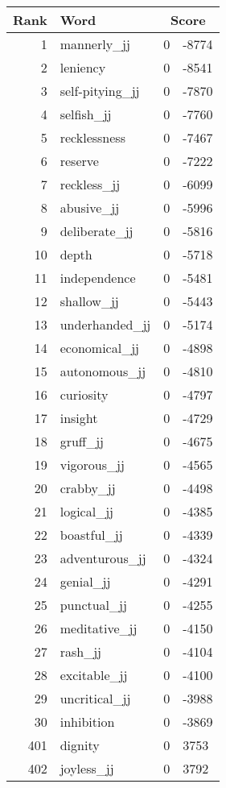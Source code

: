 \begin{longtable}[!htbp]{| rlr@{.}l |}
    \hline
    \textbf{Rank} & \textbf{Word} & \multicolumn{2}{c|}{\textbf{Score}} \\
    \hline
    \endhead
    1 & mannerly\_jj & 0 & -8774 \\
    2 & leniency & 0 & -8541 \\
    3 & self-pitying\_jj & 0 & -7870 \\
    4 & selfish\_jj & 0 & -7760 \\
    5 & recklessness & 0 & -7467 \\
    6 & reserve & 0 & -7222 \\
    7 & reckless\_jj & 0 & -6099 \\
    8 & abusive\_jj & 0 & -5996 \\
    9 & deliberate\_jj & 0 & -5816 \\
    10 & depth & 0 & -5718 \\
    11 & independence & 0 & -5481 \\
    12 & shallow\_jj & 0 & -5443 \\
    13 & underhanded\_jj & 0 & -5174 \\
    14 & economical\_jj & 0 & -4898 \\
    15 & autonomous\_jj & 0 & -4810 \\
    16 & curiosity & 0 & -4797 \\
    17 & insight & 0 & -4729 \\
    18 & gruff\_jj & 0 & -4675 \\
    19 & vigorous\_jj & 0 & -4565 \\
    20 & crabby\_jj & 0 & -4498 \\
    21 & logical\_jj & 0 & -4385 \\
    22 & boastful\_jj & 0 & -4339 \\
    23 & adventurous\_jj & 0 & -4324 \\
    24 & genial\_jj & 0 & -4291 \\
    25 & punctual\_jj & 0 & -4255 \\
    26 & meditative\_jj & 0 & -4150 \\
    27 & rash\_jj & 0 & -4104 \\
    28 & excitable\_jj & 0 & -4100 \\
    29 & uncritical\_jj & 0 & -3988 \\
    30 & inhibition & 0 & -3869 \\
    401 & dignity & 0 & 3753 \\
    402 & joyless\_jj & 0 & 3792 \\

\end{longtable}
